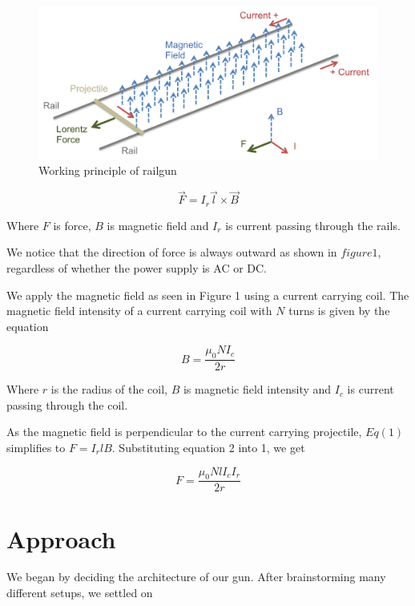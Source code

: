 \documentclass[twoside,twocolumn]{article}
\begin{document}
\begin{figure}[htp]
	\caption{Working principle of railgun}
	\includegraphics[width=\linewidth]{railgun_physics.png}
\end{figure}
	
\begin{equation}
\vec{F}=I_{r} \vec{l} \times \vec{B}
\end{equation}

Where $F$ is force, $B$ is magnetic field and $I_{r}$ is current passing through the rails.

We notice that the direction of force is always outward as shown in $figure 1$, regardless of whether the power supply is AC or DC.
 
	We apply the magnetic field as seen in Figure 1 using a current carrying coil. The magnetic field intensity of a current carrying coil with $N$ turns is given by the equation
	
\begin{equation}
B=\frac{\mu_{0} N I_{c}}{2 r}
\end{equation}

Where $r$ is the radius of the coil, $B$ is magnetic field intensity and $I_{c}$ is current passing through the coil.

As the magnetic field is perpendicular to the current carrying projectile, $Eq(1)$ simplifies to $F=I_{r} lB$.
Substituting equation 2 into 1, we get 

\begin{equation}
F=\frac{\mu_{0} N l I_{c} I_{r}}{2 r}
\end{equation}


 

\section{Approach}
We began by deciding the architecture of our gun.
After brainstorming many different setups, we settled on 
\end{document}
